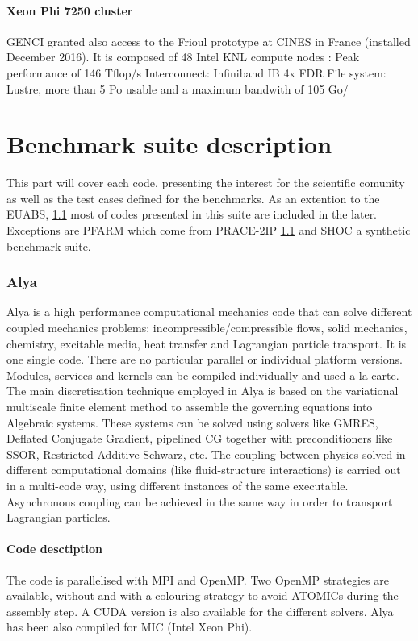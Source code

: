 \subsection{Xeon Phi 7250 cluster}
GENCI granted also access to the Frioul prototype at CINES in France (installed December 2016). It is composed of 48 Intel KNL compute nodes :
Peak performance of 146 Tflop/s
Interconnect: Infiniband IB 4x FDR
File system: Lustre, more than 5 Po usable and a maximum bandwith of 105 Go/


\part{Benchmark suite description}
This part will cover each code, presenting the interest for the scientific comunity as well as the test cases defined for the benchmarks.
As an extention to the EUABS, \ref{} most of codes presented in this suite are included in the later. Exceptions are PFARM which come from PRACE-2IP \ref{} and SHOC a synthetic benchmark suite.

\section{Alya}
Alya is a high performance computational mechanics code that can solve different coupled mechanics problems: incompressible/compressible flows, solid mechanics, chemistry, excitable media, heat transfer and Lagrangian particle transport. It is one single code. There are no particular parallel or individual platform versions. Modules, services and kernels can be compiled individually and used a la carte. The main discretisation technique employed in Alya is based on the variational multiscale finite element method to assemble the governing equations into Algebraic systems. These systems can be solved using solvers like GMRES, Deflated Conjugate Gradient, pipelined CG together with preconditioners like SSOR, Restricted Additive Schwarz, etc. The coupling between physics solved in different computational domains (like fluid-structure interactions) is carried out in a multi-code way, using different instances of the same executable. Asynchronous coupling can be achieved in the same way in order to transport Lagrangian particles.

\subsection{Code desctiption}
The code is parallelised with MPI and OpenMP. Two OpenMP strategies are available, without and with a colouring strategy to avoid ATOMICs during the assembly step. A CUDA version is also available for the different solvers. Alya has been also compiled for MIC (Intel Xeon Phi).

